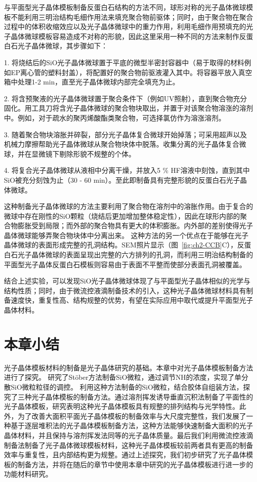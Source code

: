 与平面型光子晶体模板制备反蛋白石结构的方法不同，球形对称的光子晶体微球模板不能利用三明治结构毛细作用法来填充聚合物前驱体；同时，由于聚合物在聚合过程中的体积收缩效应以及光子晶体微球中的重力作用，利用毛细作用预填充的光子晶体微球模板容易造成不对称的形貌，因此这里采用一种不同的方法来制作反蛋白石光子晶体微球，其步骤如下：

1. 将烧结后的SiO光子晶体微球置于平底的微型半密封容器中（易于取得的材料例如EP离心管的塑料封盖），将配置好的聚合物前驱液灌入其中。将容器平放入真空箱中处理1-2 min，直至光子晶体微球内部完全填充为止。

2. 将含预聚液的光子晶体微球置于聚合条件下（例如UV照射），直到聚合物充分固化。用工具刀将含光子晶体微球的聚合物块取出，并置于对该聚合物溶涨的溶剂中。例如，对于疏水的聚丙烯酸酯类聚合物，可选择氯仿作为溶涨溶剂。

3. 随着聚合物块溶胀并碎裂，部分光子晶体复合微球开始掉落；可采用超声以及机械力摩擦帮助光子晶体微球从聚合物块体中脱落。收集分离的光子晶体复合微球，并在显微镜下剔除形貌不规整的个体。

4. 将复合光子晶体微球从液相中分离干燥，并放入5 \% HF溶液中刻蚀，直到其中SiO被充分刻蚀为止（30 - 60 min）。至此即制备具有完整形貌的反蛋白石光子晶体微球。

这种制备光子晶体微球的方法主要利用了聚合物在溶剂中的溶胀作用。由于复合的微球中存在刚性的SiO颗粒（烧结后更加增加整体稳定性），因此在球形内部的聚合物膨胀受到局限；而外部的聚合物具有更大的体积膨胀。内外部的差别使得光子晶体微球能够弄聚合物块体中分离出来。
这种方法的另一个优点在于能够在光子晶体微球的表面形成完整的孔洞结构。SEM照片显示（图~\ref{fig:ch2-CCB}C），反蛋白石光子晶体微球的表面呈现出完整的六方排列的孔洞，而利用三明治结构制备的平面型光子晶体反蛋白石模板则容易由于表面不平整而使部分表面孔洞被覆盖。

结合上述实验，可以发现SiO光子晶体微球体现了与平面型光子晶体相似的光学与结构性质；同时，由于微流控液滴制备技术的引入，这种光子晶体微球材料具有制备速度快，重复性高、结构规整的优势，有望在实际应用中取代或提升平面型光子晶体材料。

\section{本章小结}

光子晶体模板材料的制备是光子晶体研究的基础。本章中对光子晶体模板制备方法进行了探究。
研究了Stöber方法制备SiO微粒，通过调节NH的浓度，实现了单分散SiO微粒粒径的调控。
利用这种方法制备的SiO微粒，结合胶体自组装方法，探究了三种光子晶体模板的制备方法。通过溶剂挥发诱导垂直沉积法制备了平面性的光子晶体模板，研究表明这种光子晶体模板具有规整的排列结构与光学特性。此外，为了改善大面积平面光子晶体模板的制备效率与大尺度完整性，我们发展了一种基于逐层堆积法的光子晶体模板制备方法，这种方法能够快速制备大面积的光子晶体材料，并且保持与溶剂挥发法同等的光子晶体质量。最后我们利用微流控液滴制备法制备了光子晶体微球模板材料，这种光子晶体模板较前两者具有更高的制备效率与重复性，且内部结构更为规整。通过上述探究，我们初步研究了光子晶体模板的制备方法，并将在随后的章节中使用本章中研究的光子晶体模板进行进一步的功能材料研究。

